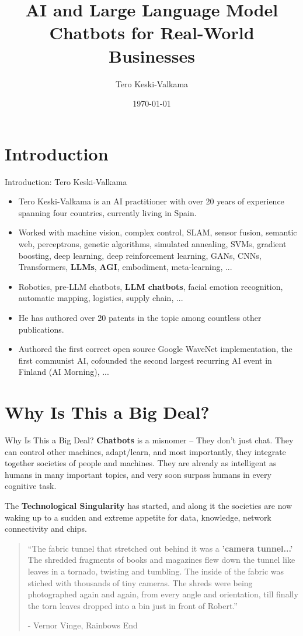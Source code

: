 \documentclass{beamer}
\title{AI and Large Language Model Chatbots for Real-World Businesses}
\author{Tero Keski-Valkama}
\date{\today}
\begin{document}
\begin{frame}
  \titlepage
\end{frame}

\section{Introduction}
\begin{frame}{Introduction: Tero Keski-Valkama}
  \begin{itemize}
    \item Tero Keski-Valkama is an AI practitioner with over 20 years of experience spanning four countries, currently living in Spain.
    \item Worked with machine vision, complex control, SLAM, sensor fusion, semantic web, perceptrons, genetic algorithms, simulated annealing, SVMs, gradient boosting, deep learning, deep reinforcement learning, GANs, CNNs, Transformers, \textbf{LLMs}, \textbf{AGI}, embodiment, meta-learning, ...
    \item Robotics, pre-LLM chatbots, \textbf{LLM chatbots}, facial emotion recognition, automatic mapping, logistics, supply chain, ...
    \item He has authored over 20 patents in the topic among countless other publications.
    \item Authored the first correct open source Google WaveNet implementation, the first communist AI, cofounded the second largest recurring AI event in Finland (AI Morning), ...
  \end{itemize}
\end{frame}

\section{Why Is This a Big Deal?}
\begin{frame}{Why Is This a Big Deal?}
  \textbf{Chatbots} is a misnomer – They don't just chat. They can control other machines, adapt/learn, and most importantly, they integrate together societies of people and machines. They are already as intelligent as humans in many important topics, and very soon surpass humans in every cognitive task.

  The \textbf{Technological Singularity} has started, and along it the societies are now waking up to a sudden and extreme appetite for data, knowledge, network connectivity and chips.

  \vspace{0.2cm}

  \begin{quote}
   ``The fabric tunnel that stretched out behind it was a \textbf{'camera tunnel...'} The shredded fragments of books and magazines flew down the tunnel like leaves in a tornado, twisting and tumbling. The inside of the fabric was stiched with thousands of tiny cameras. The shreds were being photographed again and again, from every angle and orientation, till finally the torn leaves dropped into a bin just in front of Robert.''

   - Vernor Vinge, Rainbows End
  \end{quote}

\end{frame}
\end{document}
